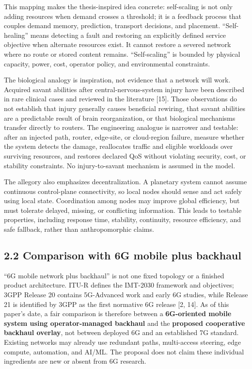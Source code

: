 \documentclass[
  american,
  11pt,
]{article}
\begin{document}
This mapping makes the thesis-inspired idea concrete: self-scaling is
not only adding resources when demand crosses a threshold; it is a
feedback process that couples demand memory, prediction, transport
decisions, and placement. ``Self-healing'' means detecting a fault and
restoring an explicitly defined service objective when alternate
resources exist. It cannot restore a severed network where no route or
stored content remains. ``Self-scaling'' is bounded by physical
capacity, power, cost, operator policy, and environmental constraints.

The biological analogy is inspiration, not evidence that a network will
work. Acquired savant abilities after central-nervous-system injury have
been described in rare clinical cases and reviewed in the literature
{[}15{]}. Those observations do not establish that injury generally
causes beneficial rewiring, that savant abilities are a predictable
result of brain reorganization, or that biological mechanisms transfer
directly to routers. The engineering analogue is narrower and testable:
after an injected path, router, edge-site, or cloud-region failure,
measure whether the system detects the damage, reallocates traffic and
eligible workloads over surviving resources, and restores declared QoS
without violating security, cost, or stability constraints. No
injury-to-savant mechanism is assumed in the model.

The allegory also emphasizes decentralization. A planetary system cannot
assume continuous control-plane connectivity, so local nodes should
sense and act safely using local state. Coordination among nodes may
improve global efficiency, but must tolerate delayed, missing, or
conflicting information. This leads to testable properties, including
response time, stability, continuity, resource efficiency, and safe
fallback, rather than anthropomorphic claims.

\subsection{2.2 Comparison with 6G mobile plus
backhaul}\label{comparison-with-6g-mobile-plus-backhaul}

``6G mobile network plus backhaul'' is not one fixed topology or a
finished product architecture. ITU-R defines the IMT-2030 framework and
objectives; 3GPP Release 20 contains 5G-Advanced work and early 6G
studies, while Release 21 is identified by 3GPP as the first normative
6G release {[}2, 14{]}. As of this paper's date, a fair comparison is
therefore between a \textbf{6G-oriented mobile system using
operator-managed backhaul} and the \textbf{proposed cooperative backhaul
overlay}, not between deployed 6G and an established 7G standard.
Existing networks may already use redundant paths, multi-access
steering, edge compute, automation, and AI/ML. The proposal does not
claim these individual ingredients are new or absent from 6G research.
\end{document}
